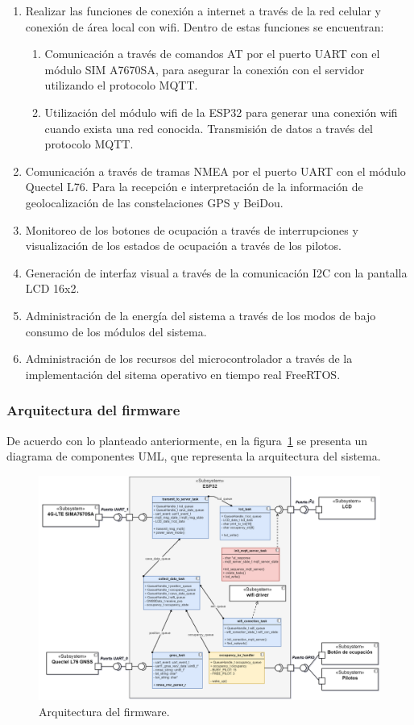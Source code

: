 \begin{enumerate}
 \item Realizar las funciones de conexión a internet a través de la red celular y conexión de área local con wifi. Dentro de estas funciones se encuentran:
 	\begin{enumerate}
 		\item Comunicación a través de comandos AT por el puerto UART con el módulo SIM A7670SA, para asegurar la conexión con el servidor utilizando el protocolo MQTT.
 		\item Utilización del módulo wifi de la ESP32 para generar una conexión wifi cuando exista una red conocida. Transmisión de datos a través del protocolo MQTT. 
 	\end{enumerate}
 \item Comunicación a través de tramas NMEA por el puerto UART con el módulo Quectel L76. Para la recepción e interpretación de la información de geolocalización de las constelaciones GPS y BeiDou.  
 \item Monitoreo de los botones de ocupación a través de interrupciones y visualización de los estados de ocupación a través de los pilotos. 
 \item Generación de interfaz visual a través de la comunicación I2C con la pantalla LCD 16x2. 
 \item Administración de la energía del sistema a través de los modos de bajo consumo de los módulos del sistema. 
 \item Administración de los recursos del microcontrolador a través de la implementación del sitema operativo en tiempo real FreeRTOS. 
\end{enumerate}

\subsubsection{Arquitectura del firmware}
\label{arquitectura_firmware}

De acuerdo con lo planteado anteriormente, en la figura~\ref{fig:arq_firmware} se presenta un diagrama de componentes UML, que representa la arquitectura del sistema. 

\begin{figure}[htbp]
	\centering
	\includegraphics[width=1\textwidth]{./Figures/Arquitectura_firmware_TFE_GNSS.png}
	\caption{Arquitectura del firmware.}
	\label{fig:arq_firmware}
\end{figure}


